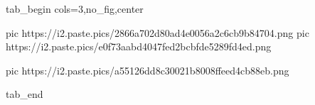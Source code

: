  
 
 
 
 


\ifcmt
  tab_begin cols=3,no_fig,center

     pic https://i2.paste.pics/2866a702d80ad4e0056a2c6cb9b84704.png
		 pic https://i2.paste.pics/e0f73aabd4047fed2bcbfde5289fd4ed.png

		 pic https://i2.paste.pics/a55126dd8c30021b8008ffeed4cb88eb.png

  tab_end
\fi
